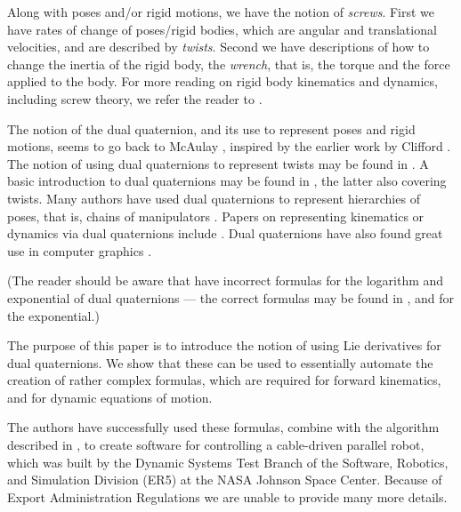 \documentclass[reqno,12pt]{amsart}
\begin{document}
Along with poses and/or rigid motions, we have the notion of \emph{screws}.  First we have rates of change of poses/rigid bodies, which are angular and translational velocities, and are described by \emph{twists}.  Second we have descriptions of how to change the inertia of the rigid body, the \emph{wrench}, that is, the torque and the force applied to the body.  For more reading on rigid body kinematics and dynamics, including screw theory, we refer the reader to \cite{ball,bottema-et-al,gallardo-alvarado,selig-book}.

The notion of the dual quaternion, and its use to represent poses and rigid motions, seems to go back to McAulay \cite{mcauley}, inspired by the earlier work by Clifford \cite{clifford}.  The notion of using dual quaternions to represent twists may be found in \cite{adorno,perez-et-al}.  A basic introduction to dual quaternions may be found in \cite{kenwright,montgomery-smith-et-al}, the latter also covering twists.  Many authors have used dual quaternions to represent hierarchies of poses, that is, chains of manipulators \cite{kenwright,perez-et-al,schilling1,schilling2,silva-et-al}.  Papers on representing kinematics or dynamics via dual quaternions include \cite{adorno,agrawal,dooley-et-al,han-et-al,kussaba-et-al,spong-et-al,wang-et-al}.  Dual quaternions have also found great use in computer graphics \cite{kavan-et-al,kavan-et-al-2}.

(The reader should be aware that \cite{adorno,han-et-al} have incorrect formulas for the logarithm and exponential of dual quaternions --- the correct formulas may be found in \cite{montgomery-smith-functional-calculus}, and \cite{selig} for the exponential.)


The purpose of this paper is to introduce the notion of using Lie derivatives for dual quaternions.  We show that these can be used to essentially automate the creation of rather complex formulas, which are required for forward kinematics, and for dynamic equations of motion.

The authors have successfully used these formulas, combine with the algorithm described in \cite{montgomery-smith-parallel}, to create software for controlling a cable-driven parallel robot, which was built by the Dynamic Systems Test Branch of the Software, Robotics, and Simulation Division (ER5) at the NASA Johnson Space Center.  Because of Export Administration Regulations we are unable to provide many more details.
\end{document}
